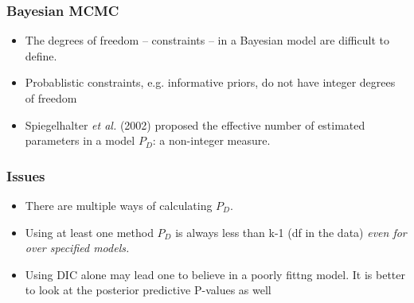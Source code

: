 \documentclass{beamer}
\begin{document}
\begin{frame}
 \frametitle{Bayesian MCMC}
 \begin{itemize}
  \item The degrees of freedom -- constraints -- in a Bayesian model are difficult to define.
  \item Probablistic constraints, e.g. informative priors, do not have integer degrees of freedom
  \item Spiegelhalter \emph{et al.} (2002) proposed the effective number of estimated parameters in a model $P_D$: a non-integer measure.
 \end{itemize}
\end{frame}

\begin{frame}
 \frametitle{Issues}
 \begin{itemize}
  \item There are multiple ways of calculating $P_D$.
  \item Using at least one method $P_D$ is always less than k-1 (df in the data) \emph{even for over specified models.}
  \item Using DIC alone may lead one to believe in a poorly fittng model. It is better to look at the posterior predictive P-values as well
 \end{itemize}

\end{frame}
\end{document}
